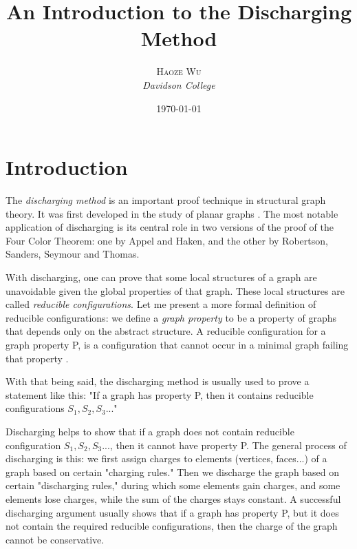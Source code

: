 \documentclass[a4paper, 11pt]{article} %
\title{\textbf{An Introduction to the Discharging Method}} %
\author{\textsc{Haoze Wu} %
\\{\textit{Davidson College}}} %
\date{\today} %
\makeatletter
\renewcommand{\maketitle}{ %
\begin{centering} %
{\LARGE\@title} %

\vspace{20pt} %

{\large\@author} %


\end{centering}
}
\makeatother
\begin{document}
\maketitle %




\vspace{30pt} %


\section{Introduction}

The \textit{discharging method} is an important proof technique in structural graph theory. It was first developed in the study of planar graphs \cite{cranston2013guide}. The most notable application of discharging is its central role in two versions of the proof of the Four Color Theorem: one by Appel and Haken, and the other by Robertson, Sanders, Seymour and Thomas.

With discharging, one can prove that some local structures of a graph are unavoidable given the global properties of that graph. These local structures are called \textit{reducible configurations}. Let me present a more formal definition of reducible configurations: we define a \textit{graph property} to be a property of graphs that depends only on the abstract structure. A reducible configuration for a graph property P, is a configuration that cannot occur in a minimal graph failing that property \cite{cranston2013guide}.

With that being said, the discharging method is usually used to prove a statement like this:
"If a graph has property P, then it contains reducible configurations $S_{1}, S_{2}, S_{3}$..."

Discharging helps to show that if a graph does not contain reducible configuration $S_{1}, S_{2}, S_{3}$..., then it cannot have property P. The general process of discharging is this: we first assign charges to elements (vertices, faces...) of a graph based on certain "charging rules." Then we discharge the graph based on certain "discharging rules," during which some elements gain charges, and some elements lose charges, while the sum of the charges stays constant. A successful discharging argument usually shows that if a graph has property P, but it does not contain the required reducible configurations, then the charge of the graph cannot be conservative.
\end{document}
